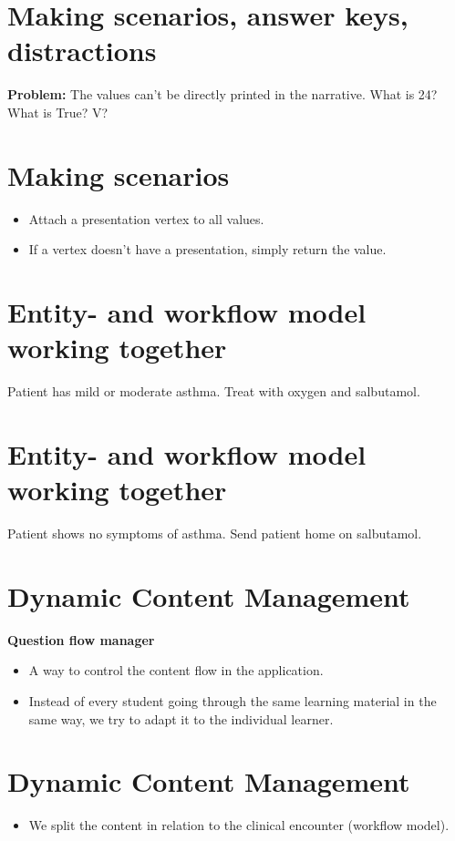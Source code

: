 \documentclass[20pt]{extarticle}
\begin{document}
	\section{Making scenarios, answer keys, distractions}
	\textbf{Problem:} The values can't be directly printed in the narrative. What is 24? What is True? V?

	\section{Making scenarios}
	\begin{itemize}
		\item Attach a presentation vertex to all values.
		\item If a vertex doesn't have a presentation, simply return the value.
	\end{itemize}

	\section{Entity- and workflow model working together}
	Patient has mild or moderate asthma. Treat with oxygen and salbutamol.

	\section{Entity- and workflow model working together}
	Patient shows no symptoms of asthma. Send patient home on salbutamol.

	\section{Dynamic Content Management}
	\textbf{Question flow manager}
	\begin{itemize}
		\item A way to control the content flow in the application.
		\item Instead of every student going through the same learning material in the same way, we try to adapt it to the individual learner.
	\end{itemize}

	\section{Dynamic Content Management}
	\begin{itemize}
		\item We split the content in relation to the clinical encounter (workflow model).
	\end{itemize}
\end{document}
